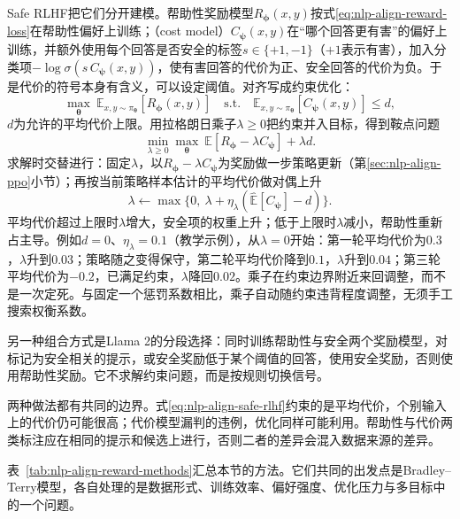 Safe RLHF把它们分开建模。帮助性奖励模型$R_{\bm\phi}(x,y)$按式\eqref{eq:nlp-align-reward-loss}在帮助性偏好上训练；（cost model）$C_{\bm\psi}(x,y)$在“哪个回答更有害”的偏好上训练，并额外使用每个回答是否安全的标签$s\in\{+1,-1\}$（$+1$表示有害），加入分类项$-\log\sigma(s\,C_{\bm\psi}(x,y))$，使有害回答的代价为正、安全回答的代价为负。于是代价的符号本身有含义，可以设定阈值。对齐写成约束优化：
\begin{equation}
\label{eq:nlp-align-safe-rlhf}
 \max_{\bm\theta}\ \mathbb E_{x,y\sim\pi_{\bm\theta}}[R_{\bm\phi}(x,y)]
 \quad\text{s.t.}\quad
 \mathbb E_{x,y\sim\pi_{\bm\theta}}[C_{\bm\psi}(x,y)]\le d,
\end{equation}
$d$为允许的平均代价上限。用拉格朗日乘子$\lambda\ge0$把约束并入目标，得到鞍点问题
\[
 \min_{\lambda\ge0}\max_{\bm\theta}\ \mathbb E[R_{\bm\phi}-\lambda C_{\bm\psi}]+\lambda d .
\]
求解时交替进行：固定$\lambda$，以$R_{\bm\phi}-\lambda C_{\bm\psi}$为奖励做一步策略更新（第\ref{sec:nlp-align-ppo}小节）；再按当前策略样本估计的平均代价做对偶上升
\[
 \lambda\gets\max\bigl\{0,\ \lambda+\eta_\lambda(\widehat{\mathbb E}[C_{\bm\psi}]-d)\bigr\}.
\]
平均代价超过上限时$\lambda$增大，安全项的权重上升；低于上限时$\lambda$减小，帮助性重新占主导。例如$d=0$、$\eta_\lambda=0.1$（教学示例），从$\lambda=0$开始：第一轮平均代价为$0.3$，$\lambda$升到$0.03$；策略随之变得保守，第二轮平均代价降到$0.1$，$\lambda$升到$0.04$；第三轮平均代价为$-0.2$，已满足约束，$\lambda$降回$0.02$。乘子在约束边界附近来回调整，而不是一次定死。与固定一个惩罚系数相比，乘子自动随约束违背程度调整，无须手工搜索权衡系数。

另一种组合方式是Llama 2的分段选择：同时训练帮助性与安全两个奖励模型，对标记为安全相关的提示，或安全奖励低于某个阈值的回答，使用安全奖励，否则使用帮助性奖励。它不求解约束问题，而是按规则切换信号。

两种做法都有共同的边界。式\eqref{eq:nlp-align-safe-rlhf}约束的是平均代价，个别输入上的代价仍可能很高；代价模型漏判的违例，优化同样可能利用。帮助性与代价两类标注应在相同的提示和候选上进行，否则二者的差异会混入数据来源的差异。

表~\ref{tab:nlp-align-reward-methods}汇总本节的方法。它们共同的出发点是Bradley--Terry模型，各自处理的是数据形式、训练效率、偏好强度、优化压力与多目标中的一个问题。

